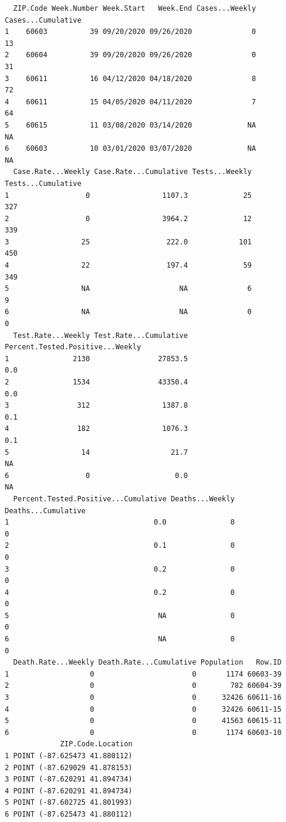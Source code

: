 \documentclass[
  letterpaper,
  DIV=11,
  numbers=noendperiod]{scrreprt}
\begin{document}
\begin{verbatim}
  ZIP.Code Week.Number Week.Start   Week.End Cases...Weekly Cases...Cumulative
1    60603          39 09/20/2020 09/26/2020              0                 13
2    60604          39 09/20/2020 09/26/2020              0                 31
3    60611          16 04/12/2020 04/18/2020              8                 72
4    60611          15 04/05/2020 04/11/2020              7                 64
5    60615          11 03/08/2020 03/14/2020             NA                 NA
6    60603          10 03/01/2020 03/07/2020             NA                 NA
  Case.Rate...Weekly Case.Rate...Cumulative Tests...Weekly Tests...Cumulative
1                  0                 1107.3             25                327
2                  0                 3964.2             12                339
3                 25                  222.0            101                450
4                 22                  197.4             59                349
5                 NA                     NA              6                  9
6                 NA                     NA              0                  0
  Test.Rate...Weekly Test.Rate...Cumulative Percent.Tested.Positive...Weekly
1               2130                27853.5                              0.0
2               1534                43350.4                              0.0
3                312                 1387.8                              0.1
4                182                 1076.3                              0.1
5                 14                   21.7                               NA
6                  0                    0.0                               NA
  Percent.Tested.Positive...Cumulative Deaths...Weekly Deaths...Cumulative
1                                  0.0               0                   0
2                                  0.1               0                   0
3                                  0.2               0                   0
4                                  0.2               0                   0
5                                   NA               0                   0
6                                   NA               0                   0
  Death.Rate...Weekly Death.Rate...Cumulative Population   Row.ID
1                   0                       0       1174 60603-39
2                   0                       0        782 60604-39
3                   0                       0      32426 60611-16
4                   0                       0      32426 60611-15
5                   0                       0      41563 60615-11
6                   0                       0       1174 60603-10
             ZIP.Code.Location
1 POINT (-87.625473 41.880112)
2 POINT (-87.629029 41.878153)
3 POINT (-87.620291 41.894734)
4 POINT (-87.620291 41.894734)
5 POINT (-87.602725 41.801993)
6 POINT (-87.625473 41.880112)
\end{verbatim}
\end{document}
